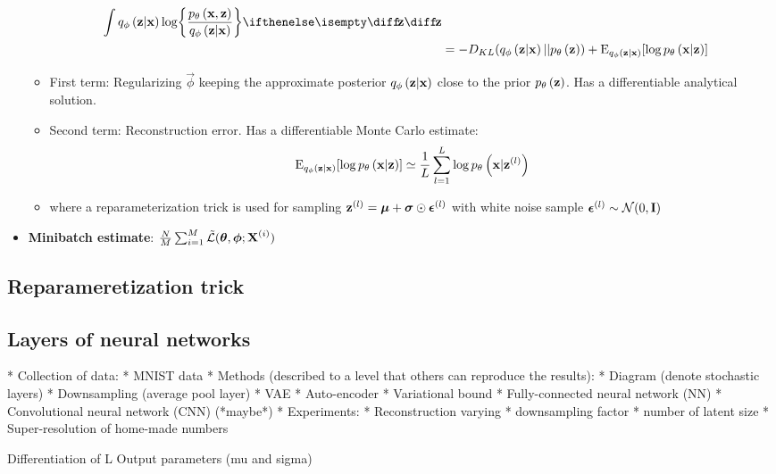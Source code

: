 \begin{itemize}
\begin{itemize}
\begin{gather}
\begin{split}
					\int \enc{\vec{z}|\vec{x}} \log \curlies*{ \frac{\dec{\vec{x},\vec{z}}}{\enc{\vec{z}|\vec{x}} } } \D{\vec{z}} \\
					& = -D_{KL}\parens{ \enc{\vec{z}|\vec{x}}||\dec{\vec{z}} } + \E_{\enc{\vec{z}|\vec{x}}} \brackets{\log \dec{\vec{x}|\vec{z}} }
				\end{split}
			\end{gather}
		\item First term: Regularizing $\vec{\phi}$ keeping the approximate posterior $q_{\phi}\left(\bm{\mathrm{z}}|\bm{\mathrm{x}}\right)$ close to the prior $p_{\theta}\left(\bm{\mathrm{z}}\right)$. Has a differentiable analytical solution.
		\item Second term: Reconstruction error. Has a differentiable Monte Carlo estimate:
		\begin{equation}
			\operatorname{E}_{q_{\phi}\left(\bm{\mathrm{z}}|\bm{\mathrm{x}}\right)} [\log p_{\theta}\left(\bm{\mathrm{x}}|\bm{\mathrm{z}}\right) ] \simeq \frac{1}{L}\sum^L_{l=1} \log p_{\theta}\left(\bm{\mathrm{x}}|\bm{\mathrm{z}}^{(l)}\right)
		\end{equation}
		\item where a reparameterization trick is used for sampling $\bm{\mathrm{z}}^{(l)}= \bm{\mathrm{\mu}} + \bm{\mathrm{\sigma}} \odot \bm{\mathrm{\epsilon}}^{(l)}$ with white noise sample $\bm{\mathrm{\epsilon}}^{(l)} \sim \mathcal{N}(0,\bm{\mathrm{I}})$
	\end{itemize}
	\item \textbf{Minibatch estimate}: $\frac{N}{M}\sum^{M}_{i=1}\tilde{\mathcal{L}}(\bm{\mathrm{\theta}},\bm{\mathrm{\phi}};\bm{\mathrm{X}}^{(i)})$
\end{itemize}


\subsection{Reparameretization trick} %
\label{sub:reparameretization_trick}


\subsection{Layers of neural networks} %
\label{sub:layers_of_neural_networks}



* Collection of data:
	* MNIST data
* Methods (described to a level that others can reproduce the results):
	* Diagram (denote stochastic layers)
	* Downsampling (average pool layer)
	* VAE
		* Auto-encoder
		* Variational bound
	* Fully-connected neural network (NN)
	* Convolutional neural network (CNN) (*maybe*)
* Experiments:
	* Reconstruction varying
		* downsampling factor
		* number of latent size
	* Super-resolution of home-made numbers


Differentiation of L
Output parameters (mu and sigma)